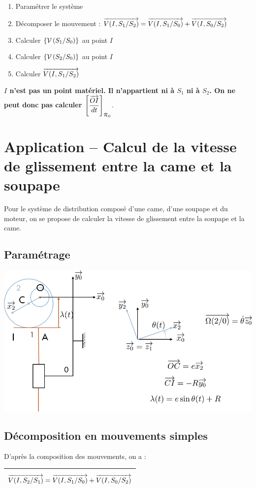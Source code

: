 \documentclass[11pt,oneside]{article}
\begin{document}
\begin{methode}
\begin{enumerate}
\item Paramétrer le système
\item Décomposer le mouvement : $\overrightarrow{V(I,S_1/S_2)}=\overrightarrow{V(I,S_1/S_0)}+\overrightarrow{V(I,S_0/S_2)}$
\item Calculer $\left\{\mathcal{V} \left(S_1/S_0 \right) \right\}$ au point $I$
\item Calculer $\left\{\mathcal{V} \left(S_2/S_0 \right) \right\}$ au point $I$
\item Calculer  $\overrightarrow{V(I,S_1/S_2)}$
\end{enumerate}
\end{methode}

\begin{warn}
\textbf{$I$ n'est pas un point matériel. Il n'appartient ni à $S_1$ ni à $S_2$. On ne peut donc pas calculer $\left[\dfrac{\overrightarrow{OI}}{dt}\right]_{\mathcal{R}_0}$}.
\end{warn}

\newpage

\section{Application -- Calcul de la vitesse de glissement entre la came et la soupape}
Pour le système de distribution composé d'une came, d'une soupape et du moteur, on se propose de calculer la vitesse de glissement entre la soupape et la came.
\subsection*{Paramétrage}
\begin{center}
\includegraphics[width=.7\textwidth]{png/parametrage} 
\end{center}

\subsection*{Décomposition en mouvements simples}
D'après la composition des mouvements, on a : 
\begin{center}
\begin{tabular}{|p{8cm}|}
\hline
$$
\overrightarrow{V(I,S_2/S_1)} = \overrightarrow{V(I,S_1/S_0)} + \overrightarrow{V(I,S_0/S_2)}
$$
\\
\hline
\end{tabular}
\end{center}
\end{document}
